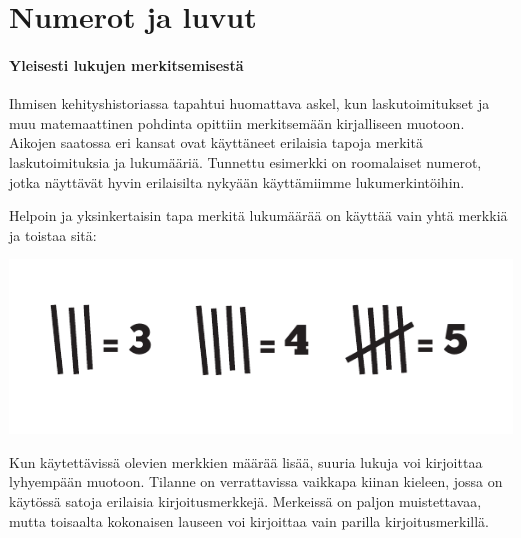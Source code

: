 \section{Numerot ja luvut}


\paragraph*{Yleisesti lukujen merkitsemisestä}

Ihmisen kehityshistoriassa tapahtui huomattava askel, kun laskutoimitukset ja muu matemaattinen pohdinta opittiin merkitsemään kirjalliseen muotoon. Aikojen saatossa eri kansat ovat käyttäneet erilaisia tapoja merkitä laskutoimituksia ja lukumääriä. Tunnettu esimerkki on roomalaiset numerot, jotka näyttävät hyvin erilaisilta nykyään käyttämiimme lukumerkintöihin.

Helpoin ja yksinkertaisin tapa merkitä lukumäärää on käyttää vain yhtä merkkiä ja toistaa sitä:


\begin{center}
\includegraphics{pictures/Kuva1-1-tukkimiehenkirjanpito.pdf}
\end{center}

Kun käytettävissä olevien merkkien määrää lisää, suuria lukuja voi kirjoittaa lyhyempään muotoon. Tilanne on verrattavissa vaikkapa kiinan kieleen, jossa on käytössä satoja erilaisia kirjoitusmerkkejä. Merkeissä on paljon muistettavaa, mutta toisaalta kokonaisen lauseen voi kirjoittaa vain parilla kirjoitusmerkillä.



